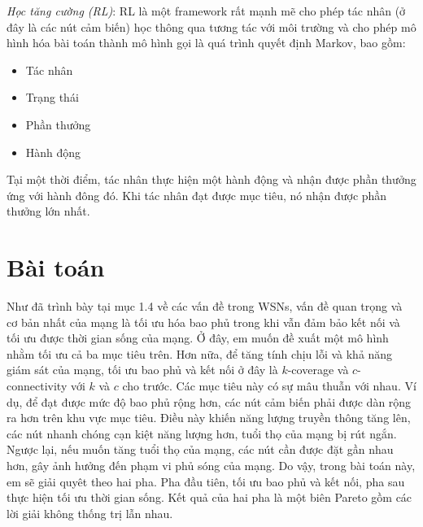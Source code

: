 \documentclass{article}
\begin{document}
\newline \emph{Học tăng cường (RL)}: RL là một framework rất mạnh mẽ cho phép tác nhân (ở đây là các nút cảm biến) học thông qua tương tác với môi trường và cho phép mô hình hóa bài toán thành mô hình gọi là quá trình quyết định Markov, bao gồm:
\begin{itemize}
    \item Tác nhân
    \item Trạng thái
    \item Phần thưởng
    \item Hành động
\end{itemize}
Tại một thời điểm, tác nhân thực hiện một hành động và nhận được phần thưởng ứng với hành đông đó. Khi tác nhân đạt được mục tiêu, nó nhận được phần thưởng lớn nhất. 


\section{Bài toán}
Như đã trình bày tại mục 1.4 về các vấn đề trong \gls{WSNs}, vấn đề quan trọng và cơ bản nhất của mạng là tối ưu hóa bao phủ trong khi vẫn đảm bảo kết nối và tối ưu được thời gian sống của mạng. Ở đây, em muốn đề xuất một mô hình nhằm tối ưu cả ba mục tiêu trên.  Hơn nữa, để tăng tính chịu lỗi và khả năng giám sát của mạng, tối ưu bao phủ và kết nối ở đây là $k$-coverage và $c$-connectivity với $k$ và $c$ cho trước. Các mục tiêu này có sự  mâu thuẫn với nhau. Ví dụ, để đạt được mức độ bao phủ rộng hơn, các nút cảm biến phải được dàn rộng ra hơn trên khu vực mục tiêu. Điều này khiến năng lượng truyền thông tăng lên, các nút nhanh chóng cạn kiệt năng lượng hơn, tuổi thọ của mạng bị rút ngắn. Ngược lại, nếu muốn tăng tuổi thọ của mạng, các nút cần được đặt gần nhau hơn, gây ảnh hưởng đến phạm vi phủ sóng của mạng. Do vậy, trong bài toán này, em sẽ giải quyêt theo hai pha. Pha đầu tiên, tối ưu bao phủ và kết nối, pha sau thực hiện tối ưu thời gian sống. Kết quả của hai pha là một biên Pareto gồm các lời giải không thống trị lẫn nhau. 
\end{document}
